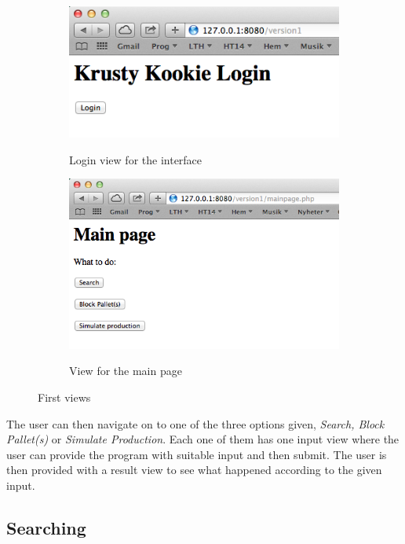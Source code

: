 \documentclass[a4paper]{scrartcl}
\numberwithin{equation}{section}
\begin{document}
\begin{figure}[h!]
  \centering
  	\begin{subfigure}[b]{0.45\textwidth}
    	\includegraphics[width=\textwidth]{figures/view_login.png}
    	\label{figure:view_login}
    	\caption{Login view for the interface}
 		\end{subfigure}	
 		\begin{subfigure}[b]{0.45\textwidth}
    	\includegraphics[width=\textwidth]{figures/view_mainpage.png}
    	\label{figure:view_mainpage}
    	\caption{View for the main page}
 		\end{subfigure} 
 		\caption{First views}
\end{figure}

The user can then navigate on to one of the three options given, \emph{Search, Block Pallet(s)} or \emph{Simulate Production}. Each one of them has one input view where the user can provide the program with suitable input and then submit. The user is then provided with a result view to see what happened according to the given input.

\subsection*{Searching}
\end{document}
